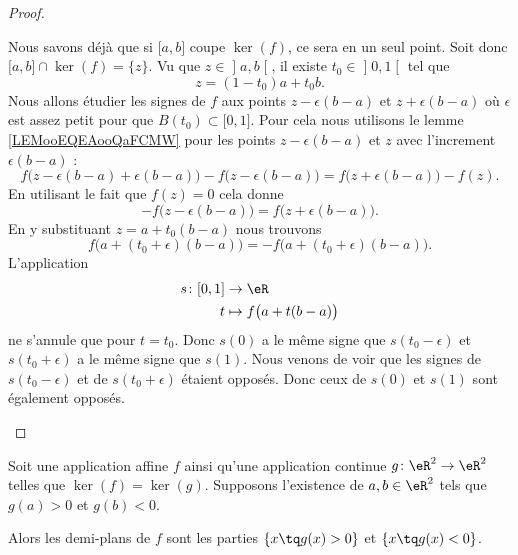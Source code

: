 \begin{proof}
\begin{subproof}
    Nous savons déjà que si \( \mathopen[ a , b \mathclose]\) coupe $\ker(f)$, ce sera en un seul point. Soit donc \( \mathopen[ a , b \mathclose]\cap\ker(f)=\{ z \}\). Vu que \( z\in \mathopen] a , b \mathclose[\), il existe \( t_0\in \mathopen] 0 , 1 \mathclose[\) tel que
    \begin{equation}
        z=(1-t_0)a+t_0b.
    \end{equation}
    Nous allons étudier les signes de \( f\) aux points \( z-\epsilon(b-a)\) et \( z+\epsilon(b-a)\) où \( \epsilon\) est assez petit pour que \( B(t_0)\subset \mathopen[ 0 , 1 \mathclose]\). Pour cela nous utilisons le lemme \ref{LEMooEQEAooQaFCMW} pour les points \( z-\epsilon(b-a)\) et \( z\) avec l'increment \( \epsilon(b-a)\) :
    \begin{equation}
        f\big( z-\epsilon(b-a)+\epsilon(b-a) \big)-f\big( z-\epsilon(b-a) \big)=f\big( z+\epsilon(b-a) \big)-f(z).
    \end{equation}
    En utilisant le fait que \( f(z)=0\) cela donne
    \begin{equation}
        -f\big( z-\epsilon(b-a) \big)=f\big( z+\epsilon(b-a) \big).
    \end{equation}
    En y substituant \( z=a+t_0(b-a)\) nous trouvons
    \begin{equation}
        f\big( a+(t_0+\epsilon)(b-a) \big)=-f\big( a+(t_0+\epsilon)(b-a) \big).
    \end{equation}
    L'application
    \begin{equation}
        \begin{aligned}
            s\colon \mathopen[ 0 , 1 \mathclose]&\to \eR \\
            t&\mapsto f\big( a+t(b-a) \big) 
        \end{aligned}
    \end{equation}
    ne s'annule que pour \( t=t_0\). Donc \( s(0)\) a le même signe que \( s(t_0-\epsilon)\) et \( s(t_0+\epsilon)\) a le même signe que \( s(1)\). Nous venons de voir que les signes de \( s(t_0-\epsilon)\) et de \( s(t_0+\epsilon)\) étaient opposés. Donc ceux de \( s(0)\) et \( s(1)\) sont également opposés.
    \end{subproof}
\end{proof}


\begin{lemma}       \label{LEMooURPNooYRsuaI}
    Soit une application affine \( f\) ainsi qu'une application continue \( g\colon \eR^2\to \eR^2\) telles que \( \ker(f)=\ker(g)\). Supposons l'existence de \( a,b\in \eR^2\) tels que \( g(a)>0\) et \( g(b)<0\).

    Alors les demi-plans de \( f\) sont les parties \( \{ x\tq g(x)>0 \}\) et \( \{ x\tq g(x)<0 \}\).
\end{lemma}

